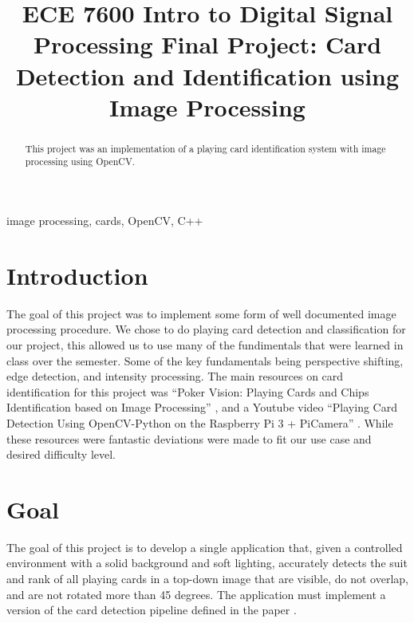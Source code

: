 \documentclass[conference]{IEEEtran}
\begin{document}
\title{ECE 7600 Intro to Digital Signal Processing Final Project:
Card Detection and Identification using Image Processing
}

\author{
\and
{}
}

\maketitle

\begin{abstract}
    This project was an implementation of a playing card identification system with image processing
    using OpenCV.
\end{abstract}

\begin{IEEEkeywords}
image processing, cards, OpenCV, C++
\end{IEEEkeywords}

\section{Introduction}
The goal of this project was to implement some form of well documented image processing procedure.
We chose to do playing card detection and classification for our project, this allowed us to use
many of the fundimentals that were learned in class over the semester. Some of the key fundamentals
being perspective shifting, edge detection, and intensity processing. The main resources on card
identification for this project was ``Poker Vision: Playing Cards and Chips Identification based on
Image Processing'' \cite{poker-vision}, and a Youtube video ``Playing Card Detection Using
OpenCV-Python on the Raspberry Pi 3 + PiCamera'' \cite{opencv-card-detection}. While these
resources were fantastic deviations were made to fit our use case and desired difficulty level.

\section{Goal}
The goal of this project is to develop a single application that, given a controlled environment
with a solid background and soft lighting, accurately detects the suit and rank of all playing cards
in a top-down image that are visible, do not overlap, and are not rotated more than 45 degrees. The
application must implement a version of the card detection pipeline defined in the paper
\cite{poker-vision}.
\end{document}
